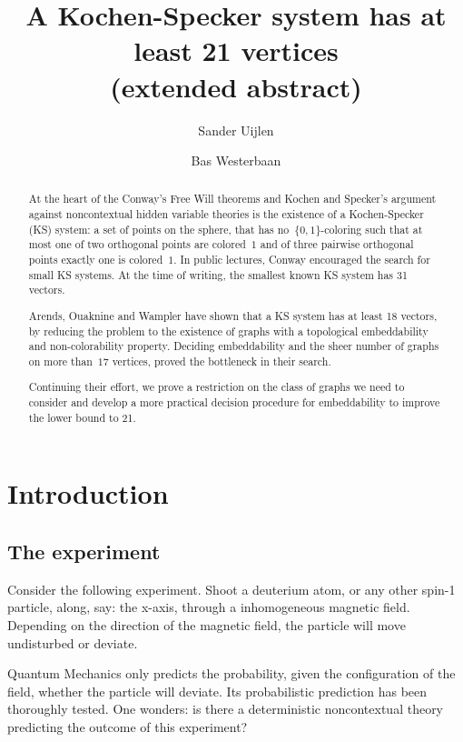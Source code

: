 \documentclass[a4paper]{article}
\title{A Kochen-Specker system has at least 21 vertices\\
        {\small (extended abstract)}}
\author{Sander Uijlen}
\author{Bas Westerbaan}
\affil{{\small Institute for Computing and Information Sciences\\
        Radboud Universiteit Nijmegen}\\
   \{\texttt{suijlen},\texttt{bwesterb}\}\texttt{@cs.ru.nl}}
\theoremstyle{definition}
\theoremstyle{remark}
\begin{document}
\maketitle

\begin{abstract}
    At the heart of the Conway's Free Will theorems and Kochen and Specker's
        argument against noncontextual hidden variable theories
    is the existence of a Kochen-Specker (KS) system:
    a set of points on the sphere,
    that has no~$\{0,1\}$-coloring such that
    at most one of two orthogonal points are colored~$1$
    and of three pairwise orthogonal points exactly one
    is colored~$1$.
    In public lectures, Conway encouraged the search for small
    KS systems.  
    At the time of writing, the smallest known
    KS system has 31 vectors.  

    Arends, Ouaknine and Wampler have shown that a KS system has at least
    18 vectors, by reducing the problem to the existence of graphs
    with a topological embeddability and non-colorability property.
    Deciding embeddability and the sheer number of graphs on more than~$17$
    vertices, proved the bottleneck in their search.

    Continuing their effort, we prove a restriction on the class of graphs
    we need to consider and develop a more practical decision procedure for
    embeddability to improve the lower bound to 21.
\end{abstract}
    
\section{Introduction}

\subsection{The experiment}

Consider the following experiment.  Shoot a deuterium atom,
or any other spin-1 particle,
along, say: the x-axis, through a inhomogeneous magnetic field.
Depending on the direction of the magnetic field,
the particle will move undisturbed
or deviate.

Quantum Mechanics only predicts the probability, given the configuration
of the field, whether the particle will deviate.
Its probabilistic prediction has been thoroughly tested.
One wonders: is there a deterministic noncontextual theory predicting the
outcome of this experiment?
\end{document}
